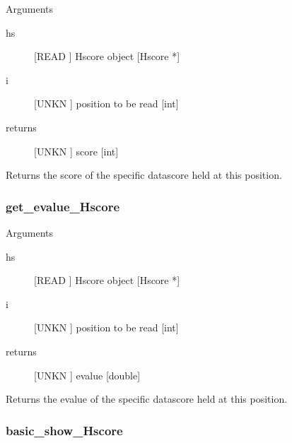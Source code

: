 Arguments
\begin{description}
\item[hs] [READ ] Hscore object [Hscore *]
\item[i] [UNKN ] position to be read [int]
\item[returns] [UNKN ] score  [int]
\end{description}


Returns the score of the specific datascore held at this position.




\subsubsection{get_evalue_Hscore}

Arguments
\begin{description}
\item[hs] [READ ] Hscore object [Hscore *]
\item[i] [UNKN ] position to be read [int]
\item[returns] [UNKN ] evalue  [double]
\end{description}
Returns the evalue of the specific datascore held at this position.




\subsubsection{basic_show_Hscore}

